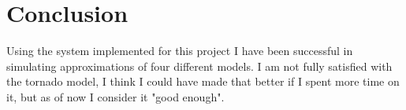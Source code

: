 \section{Conclusion}
Using the system implemented for this project I have been successful in simulating approximations of four different models. I am not fully satisfied with the tornado model, I think I could have made that better if I spent more time on it, but as of now I consider it "good enough".

